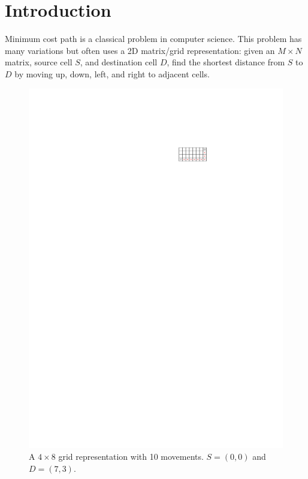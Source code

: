 
\section{Introduction}

Minimum cost path is a classical problem in computer science. This problem has many variations but often uses a 2D matrix/grid representation: given an $M \times N$ matrix, source cell $S$, and destination cell $D$, find the shortest distance from $S$ to $D$ by moving up, down, left, and right to adjacent cells.

\begin{figure}[h]
    \centering
    \includegraphics[scale=2]{figures/grid.pdf}
    \caption{ \small A $4 \times 8$ grid representation with 10 movements. $S=(0,0)$ and $D=(7, 3)$.}
    \label{fig:basic-grid}
\end{figure}


